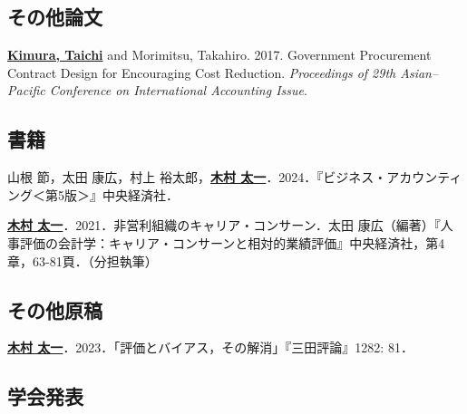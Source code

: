 \documentclass[letterpaper,uplatex]{article}
\renewenvironment{itemize}{
  \begin{list}{}{
    \setlength{\leftmargin}{1.5em}
  }
}{
  \end{list}
}
\begin{document}
\subsection*{その他論文}

\begin{itemize}
    \item \underline{\textbf{Kimura, Taichi}} and Morimitsu, Takahiro. 2017. Government Procurement Contract Design for Encouraging Cost Reduction. \textit{Proceedings of 29th Asian--Pacific Conference on International Accounting Issue}.
\end{itemize}

\subsection*{書籍}

\begin{itemize}
    \item 山根 節，太田 康広，村上 裕太郎，\underline{\textbf{木村 太一}}．2024．『ビジネス・アカウンティング＜第5版＞』中央経済社．
	\item \underline{\textbf{木村 太一}}．2021．非営利組織のキャリア・コンサーン．太田 康広（編著）『人事評価の会計学：キャリア・コンサーンと相対的業績評価』中央経済社，第4章，63-81頁．（分担執筆）
\end{itemize}

\subsection*{その他原稿}

\begin{itemize}
    \item \underline{\textbf{木村 太一}}．2023．「評価とバイアス，その解消」『三田評論』1282: 81．
\end{itemize}

\subsection*{学会発表}
\end{document}
